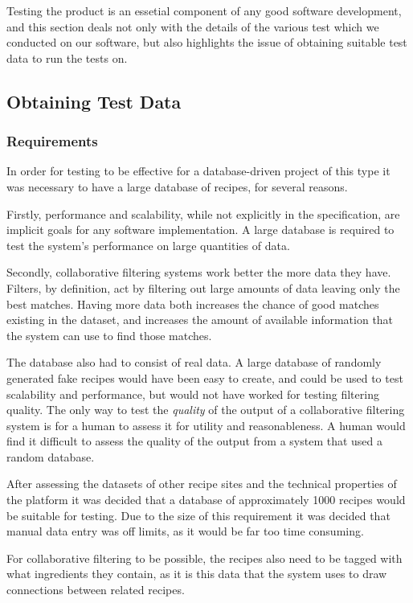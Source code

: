 Testing the product is an essetial component of any good software development, and this section deals not only with the
details of the various test which we conducted on our software, but also highlights the issue of obtaining suitable test
data to run the tests on.

\subsection{Obtaining Test Data}
\subsubsection{Requirements}
In order for testing to be effective for a database-driven project of this type it was necessary to have a large database of recipes, for several reasons.

Firstly, performance and scalability, while not explicitly in the specification, are implicit goals for any software implementation. A large database is required to test the system's performance on large quantities of data.

Secondly, collaborative filtering systems work better the more data they have. Filters, by definition, act by filtering out large amounts of data leaving only the best matches. Having more data both increases the chance of good matches existing in the dataset, and increases the amount of available information that the system can use to find those matches.

The database also had to consist of real data. A large database of randomly generated fake recipes would have been easy to create, and could be used to test scalability and performance, but would not have worked for testing filtering quality. The only way to test the \textit{quality} of the output of a collaborative filtering system is for a human to assess it for utility and reasonableness. A human would find it difficult to assess the quality of the output from a system that used a random database.

After assessing the datasets of other recipe sites and the technical properties of the platform it was decided that a database of approximately 1000 recipes would be suitable for testing. Due to the size of this requirement it was decided that manual data entry was off limits, as it would be far too time consuming.

For collaborative filtering to be possible, the recipes also need to be tagged with what ingredients they contain, as it is this data that the system uses to draw connections between related recipes.

